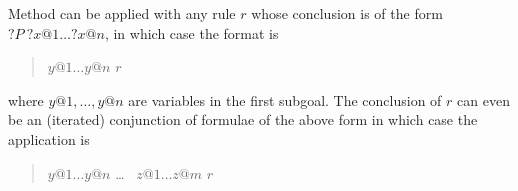 \begin{isabellebody}
\begin{isamarkuptext}
Method  can be applied with any rule $r$
whose conclusion is of the form ${?}P~?x@1 \dots ?x@n$, in which case the
format is
\begin{quote}
 $y@1 \dots y@n$  $r$\isa{{\isacharparenright}}
\end{quote}
where $y@1, \dots, y@n$ are variables in the first subgoal.
The conclusion of $r$ can even be an (iterated) conjunction of formulae of
the above form in which case the application is
\begin{quote}
 $y@1 \dots y@n$  \dots\  $z@1 \dots z@m$  $r$\isa{{\isacharparenright}}
\end{quote}


\end{isamarkuptext}
\end{isabellebody}
